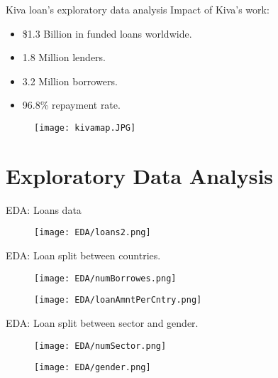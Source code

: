 \documentclass[10pt]{beamer}
\begin{document}
\begin{frame}{Kiva loan's exploratory data analysis}
Impact of Kiva's work:
\begin{itemize}
    \item \$1.3 Billion  in funded loans worldwide.
    \item 1.8 Million lenders.
    \item 3.2 Million borrowers.
    \item 96.8\% repayment rate.
\end{itemize}
\begin{figure}
    \centering
    \texttt{[image: kivamap.JPG]}
\end{figure}
\end{frame}

\section{Exploratory Data Analysis}
\begin{frame}{EDA: Loans data }
    \begin{figure}
        \centering
        \texttt{[image: EDA/loans2.png]}
    \end{figure}
\end{frame}

\begin{frame}{EDA: Loan split between countries.}
    
\begin{figure}
\centering
\begin{minipage}{.5\textwidth}
  \centering
  \texttt{[image: EDA/numBorrowes.png]}
  \label{fig:test1}
\end{minipage}%
\begin{minipage}{.5\textwidth}
  \centering
  \texttt{[image: EDA/loanAmntPerCntry.png]}
  \label{fig:test2}
\end{minipage}
\end{figure}
\end{frame}

\begin{frame}{EDA: Loan split between sector and gender.}
\begin{figure}
\centering
\begin{minipage}{.5\textwidth}
  \centering
  \texttt{[image: EDA/numSector.png]}
  \label{fig:test1}
\end{minipage}%
\begin{minipage}{.5\textwidth}
  \centering
  \texttt{[image: EDA/gender.png]}
  \label{fig:test2}
\end{minipage}
\end{figure}
\end{frame}
\end{document}

